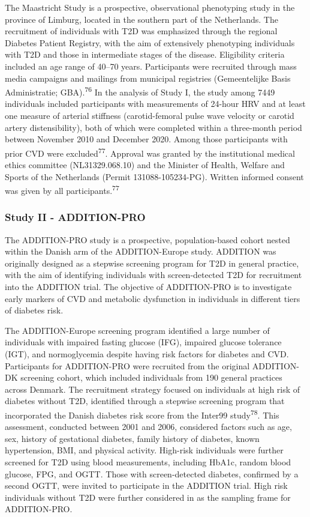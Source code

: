 \documentclass[
  a4paper,
  headsepline=true,
  open=left]{scrbook}
\begin{document}
The Maastricht Study is a prospective, observational phenotyping study
in the province of Limburg, located in the southern part of the
Netherlands. The recruitment of individuals with T2D was emphasized
through the regional Diabetes Patient Registry, with the aim of
extensively phenotyping individuals with T2D and those in intermediate
stages of the disease. Eligibility criteria included an age range of
40--70 years. Participants were recruited through mass media campaigns
and mailings from municipal registries (Gemeentelijke Basis
Administratie; GBA).\textsuperscript{76} In the analysis of Study I, the
study among 7449 individuals included participants with measurements of
24-hour HRV and at least one measure of arterial stiffness
(carotid-femoral pulse wave velocity or carotid artery distensibility),
both of which were completed within a three-month period between
November 2010 and December 2020. Among those participants with prior CVD
were excluded\textsuperscript{77}. Approval was granted by the
institutional medical ethics committee (NL31329.068.10) and the Minister
of Health, Welfare and Sports of the Netherlands (Permit
131088-105234-PG). Written informed consent was given by all
participants.\textsuperscript{77}

\hypertarget{study-ii---addition-pro}{%
\subsubsection{Study II - ADDITION-PRO}\label{study-ii---addition-pro}}

The ADDITION-PRO study is a prospective, population-based cohort nested
within the Danish arm of the ADDITION-Europe study. ADDITION was
originally designed as a stepwise screening program for T2D in general
practice, with the aim of identifying individuals with screen-detected
T2D for recruitment into the ADDITION trial. The objective of
ADDITION-PRO is to investigate early markers of CVD and metabolic
dysfunction in individuals in different tiers of diabetes risk.

The ADDITION-Europe screening program identified a large number of
individuals with impaired fasting glucose (IFG), impaired glucose
tolerance (IGT), and normoglycemia despite having risk factors for
diabetes and CVD. Participants for ADDITION-PRO were recruited from the
original ADDITION-DK screening cohort, which included individuals from
190 general practices across Denmark. The recruitment strategy focused
on individuals at high risk of diabetes without T2D, identified through
a stepwise screening program that incorporated the Danish diabetes risk
score from the Inter99 study\textsuperscript{78}. This assessment,
conducted between 2001 and 2006, considered factors such as age, sex,
history of gestational diabetes, family history of diabetes, known
hypertension, BMI, and physical activity. High-risk individuals were
further screened for T2D using blood measurements, including HbA1c,
random blood glucose, FPG, and OGTT. Those with screen-detected
diabetes, confirmed by a second OGTT, were invited to participate in the
ADDITION trial. High risk individuals without T2D were further
considered in as the sampling frame for ADDITION-PRO.
\end{document}

